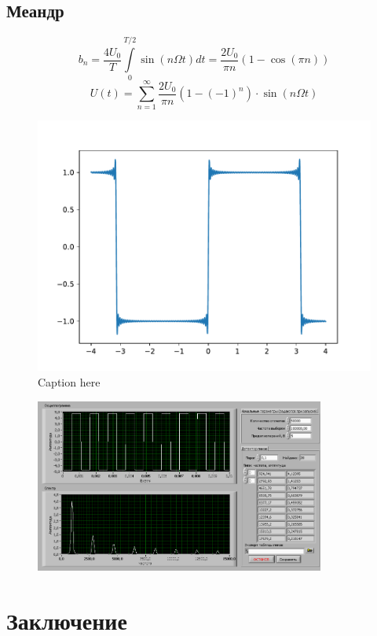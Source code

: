 \subsection{Меандр}
\begin{equation}
	b_n=\frac{4U_0}{T}\int\limits_{0}^{T/2} \sin(n\Omega t)dt=\frac{2U_0}{\pi n}(1-\cos(\pi n))
\end{equation}
\begin{equation}
	U(t)=\sum_{n=1}^{\infty}\frac{2U_0}{\pi n}(1-(-1)^n)\cdot\sin(n\Omega t)
\end{equation}
\begin{figure}[tb]
	\centering
	\includegraphics[]{plot/meandr}
	\caption{Caption here}
	\label{fig:figure1}
\end{figure}
\begin{figure}[H]
	\centering
	\includegraphics[width=0.85\textwidth]{pic/meandr_1.png}
	\caption{}
	
\end{figure}
\newpage
\section{Заключение}

